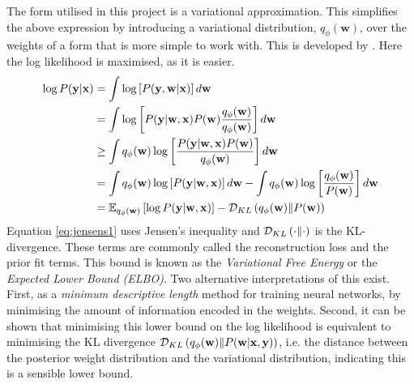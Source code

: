 The form utilised in this project is a variational approximation. This simplifies the above expression by introducing a variational distribution, \( q_\phi(\mathbf{w}) \), over the weights of a form that is more simple to work with. This is developed by \citet{Hinton1993, graves2011practical}. Here the log likelihood is maximised, as it is easier.
\begin{align}
	\log P(\mathbf{y} | \mathbf{x}) &= 
	\int \log  \left[P(\mathbf{y}, \mathbf{w} | \mathbf{x}) \right] d \mathbf{w}\\
	&= \int \log \left[P(\mathbf{y} |  \mathbf{w}, \mathbf{x})P(\mathbf{w}) \frac{q_\phi(\mathbf{w})}{q_\phi(\mathbf{w})}\right] d \mathbf{w}\\
	&\geq \int q_\phi(\mathbf{w}) \log \left[ \frac{P(\mathbf{y} |  \mathbf{w}, \mathbf{x})P(\mathbf{w})}{q_\phi(\mathbf{w})}\right] d \mathbf{w} \label{eq:jensens1}\\
	&= \int q_\phi(\mathbf{w}) \log \left[ P(\mathbf{y} |  \mathbf{w}, \mathbf{x})\right] d \mathbf{w} - \int q_\phi(\mathbf{w}) \log \left[ \frac{q_\phi(\mathbf{w})}{P(\mathbf{w})}\right] d \mathbf{w}\\
	&= \mathbb{E}_{q_\phi(\mathbf{w})}\left[ \log P(\mathbf{y} |  \mathbf{w}, \mathbf{x}) \right] - \mathcal{D}_{KL} \left( q_\phi(\mathbf{w}) \| P(\mathbf{w}) \right)
\end{align}
Equation \ref{eq:jensens1} uses Jensen's inequality and \( \mathcal{D}_{KL} \left( \cdot \| \cdot \right) \) is the KL-divergence. These terms are commonly called the reconstruction loss and the prior fit terms. This bound is known as the \textit{Variational Free Energy} or the \textit{Expected Lower Bound (ELBO)}. Two alternative interpretations of this exist. First, as a \textit{minimum descriptive length} \citep{Hinton1993} method for training neural networks, by minimising the amount of information encoded in the weights. Second, it can be shown that minimising this lower bound on the log likelihood is equivalent to minimising the KL divergence \( \mathcal{D}_{KL} \left( q_\phi(\mathbf{w}) \| P(\textbf{w}| \mathbf{x}, \mathbf{y}) \right) \), i.e. the distance between the posterior weight distribution and the variational distribution, indicating this is a sensible lower bound.

